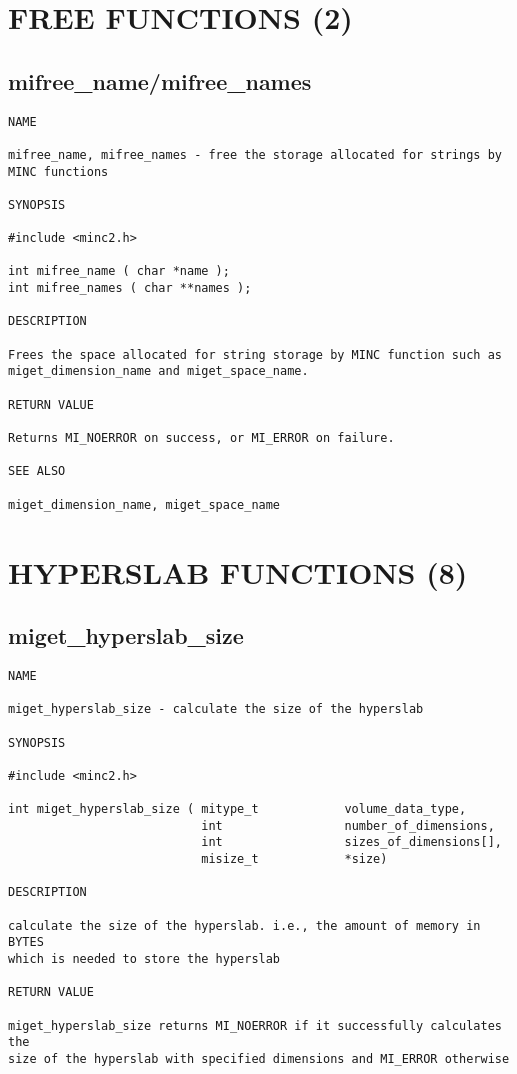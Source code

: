 \documentclass{article}
\begin{document}
\section{FREE FUNCTIONS (2)}
\subsection{mifree\_name/mifree\_names}
\begin{verbatim}
NAME

mifree_name, mifree_names - free the storage allocated for strings by 
MINC functions

SYNOPSIS

#include <minc2.h>

int mifree_name ( char *name );
int mifree_names ( char **names );

DESCRIPTION

Frees the space allocated for string storage by MINC function such as
miget_dimension_name and miget_space_name.

RETURN VALUE

Returns MI_NOERROR on success, or MI_ERROR on failure.

SEE ALSO

miget_dimension_name, miget_space_name
\end{verbatim}

\section{HYPERSLAB FUNCTIONS (8)}
\subsection{miget\_hyperslab\_size}
\begin{verbatim}
NAME

miget_hyperslab_size - calculate the size of the hyperslab

SYNOPSIS

#include <minc2.h>

int miget_hyperslab_size ( mitype_t            volume_data_type,
                           int                 number_of_dimensions,
                           int                 sizes_of_dimensions[],
                           misize_t            *size)

DESCRIPTION

calculate the size of the hyperslab. i.e., the amount of memory in BYTES
which is needed to store the hyperslab

RETURN VALUE

miget_hyperslab_size returns MI_NOERROR if it successfully calculates the
size of the hyperslab with specified dimensions and MI_ERROR otherwise
\end{verbatim}
\end{document}
